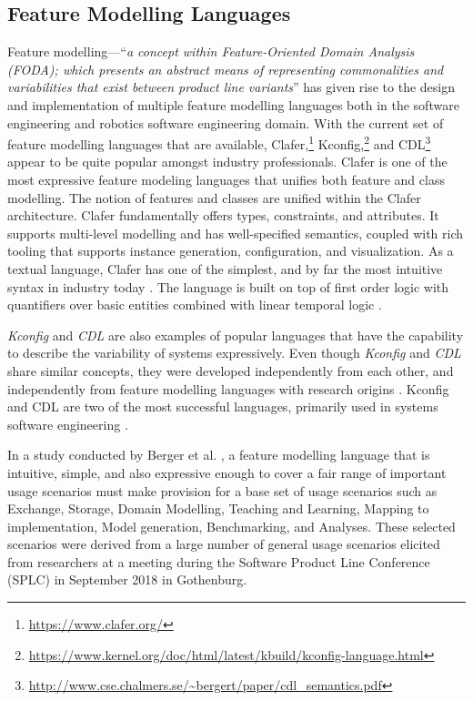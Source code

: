 \documentclass[conference]{IEEEtran}
\newcommand{\foot}[1]{\footnote{\url{#1}}}
\begin{document}
 \subsection{Feature Modelling Languages}
Feature modelling---``{\em a concept within Feature-Oriented Domain Analysis (FODA)\cite{foda-tech-rep}; which presents an abstract means of representing commonalities and variabilities that exist between product line variants}'' has given rise to the design and implementation of multiple feature modelling languages both in the software engineering and robotics software engineering domain.
With the current set of feature modelling languages that
are available, Clafer,\foot{https://www.clafer.org/} Kconfig,\foot{https://www.kernel.org/doc/html/latest/kbuild/kconfig-language.html} and CDL\foot{http://www.cse.chalmers.se/~bergert/paper/cdl_semantics.pdf} appear to be quite popular amongst industry professionals. Clafer is one of the most expressive feature modeling languages that unifies both feature and class modelling. The notion of features and classes are unified within the Clafer architecture. Clafer fundamentally offers types, constraints, and attributes. It supports multi-level modelling and has well-specified semantics, coupled with rich tooling that supports instance generation, configuration, and visualization. As a textual language, Clafer has one of the simplest, and by far the most intuitive syntax in industry today \cite{fmod-lang-scenarios}. The language is built on top of first order logic with quantifiers over basic entities combined with linear temporal logic \cite{clafer}.

\textit{Kconfig} and \textit{CDL} are also examples of popular languages that have the capability to describe the variability of systems expressively. Even though \textit{Kconfig} and \textit{CDL} share similar concepts, they were developed independently from each other, and independently from feature modelling languages with research origins \cite{vmir}. Kconfig and CDL are two of the most successful languages, primarily used in systems software engineering \cite{fmod-lang-scenarios}. 

In a study conducted by Berger et al. \cite{fmod-lang-scenarios}, a feature modelling language that is intuitive, simple, and also expressive enough to cover a fair range of important usage scenarios must make provision for a base set of usage scenarios such as Exchange, Storage, Domain Modelling, Teaching and Learning, Mapping to implementation, Model generation, Benchmarking, and Analyses. These selected scenarios were derived from a large number of general usage scenarios elicited from researchers at a meeting during the Software Product Line Conference (SPLC) in September 2018 in Gothenburg.
\end{document}
